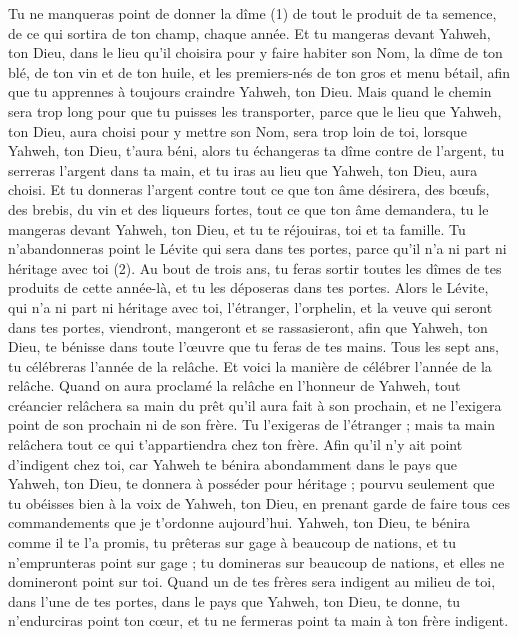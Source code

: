\begin{multicols}{2}
Tu ne manqueras point de donner la dîme (1) de tout le produit de ta semence, de ce qui sortira de ton champ, chaque année.
Et tu mangeras devant Yahweh, ton Dieu, dans le lieu qu'il choisira pour y faire habiter son Nom, la dîme de ton blé, de ton vin et de ton huile, et les premiers-nés de ton gros et menu bétail, afin que tu apprennes à toujours craindre Yahweh, ton Dieu.
Mais quand le chemin sera trop long pour que tu puisses les transporter, parce que le lieu que Yahweh, ton Dieu, aura choisi pour y mettre son Nom, sera trop loin de toi, lorsque Yahweh, ton Dieu, t'aura béni,
alors tu échangeras ta dîme contre de l’argent, tu serreras l'argent dans ta main, et tu iras au lieu que Yahweh, ton Dieu, aura choisi.
Et tu donneras l’argent contre tout ce que ton âme désirera, des bœufs, des brebis, du vin et des liqueurs fortes, tout ce que ton âme demandera, tu le mangeras devant Yahweh, ton Dieu, et tu te réjouiras, toi et ta famille.
Tu n'abandonneras point le Lévite qui sera dans tes portes, parce qu'il n'a ni part ni héritage avec toi (2).
Au bout de trois ans, tu feras sortir toutes les dîmes de tes produits de cette année-là, et tu les déposeras dans tes portes.
Alors le Lévite, qui n'a ni part ni héritage avec toi, l'étranger, l'orphelin, et la veuve qui seront dans tes portes, viendront, mangeront et se rassasieront, afin que Yahweh, ton Dieu, te bénisse dans toute l’œuvre que tu feras de tes mains.
\VerseOne{}Tous les sept ans, tu célébreras l’année de la relâche.
Et voici la manière de célébrer l’année de la relâche. Quand on aura proclamé la relâche en l'honneur de Yahweh, tout créancier relâchera sa main du prêt qu’il aura fait à son prochain, et ne l'exigera point de son prochain ni de son frère.
Tu l’exigeras de l'étranger ; mais ta main relâchera tout ce qui t’appartiendra chez ton frère.
Afin qu’il n'y ait point d’indigent chez toi, car Yahweh te bénira abondamment dans le pays que Yahweh, ton Dieu, te donnera à posséder pour héritage ;
pourvu seulement que tu obéisses bien à la voix de Yahweh, ton Dieu, en prenant garde de faire tous ces commandements que je t’ordonne aujourd'hui.
Yahweh, ton Dieu, te bénira comme il te l’a promis, tu prêteras sur gage à beaucoup de nations, et tu n'emprunteras point sur gage ; tu domineras sur beaucoup de nations, et elles ne domineront point sur toi.
Quand un de tes frères sera indigent au milieu de toi, dans l’une de tes portes, dans le pays que Yahweh, ton Dieu, te donne, tu n'endurciras point ton cœur, et tu ne fermeras point ta main à ton frère indigent.

\end{multicols}
